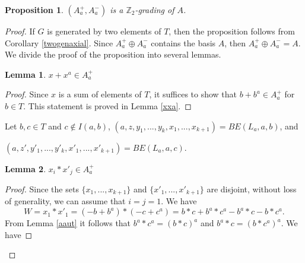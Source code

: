 \documentclass[10pt,a4paper]{amsart}
\newtheorem{lem}{Lemma}
\newtheorem{prop}{Proposition}
\newcommand\F{\mathbb{F}}
\newcommand\Z{\mathbb{Z}}
\begin{document}
\begin{prop}\label{twograd}
 $(A_a^+,A_a^-)$ is a $\Z_2$-grading of $A$. 
\end{prop}	

\begin{proof}
	If $G$ is generated by two elements of $T$, then the proposition follows from Corollary \ref{twogenaxial}. 
    Since $A_a^+\oplus A_a^-$ contains the basis $A$, then $A_a^+\oplus A_a^-=A$. We divide the proof of the proposition into several lemmas.
    
	\begin{lem}\label{xxagen}
		$x+x^a\in A^+_a$
	\end{lem}
	\begin{proof}
	Since $x$ is a sum of elements of $T$, it suffices to show that $b+b^a\in A^+_a$ for $b\in T$. This statement is proved in Lemma \ref{xxa}.
\end{proof}
	
	Let $b,c\in T$ and $c\not \in I(a,b)$, 
    $(a,z, y_1,...,y_k, x_1,...,x_{k+1})=BE(L_a, a, b)$, and
    
    $(a, z', y'_1,...,y'_k, x'_1,...,x'_{k+1})=BE(L_a, a, c)$.
		
	\begin{lem}
	$x_i*x'_j\in A^+_a$
	\end{lem}
	\begin{proof}
	

	Since the sets $\{x_1,...,x_{k+1}\}$ and $\{x'_1,...,x'_{k+1}\}$ are disjoint, without loss of generality, we can assume that $i=j=1$.
	We have
	$$W=x_1*x'_1=(-b+b^a)*(-c+c^a)=b*c+ b^a*c^a-b^a*c-b*c^a.$$
	From Lemma \ref{aaut} it follows that $b^a*c^a=(b*c)^a$ and $b^a*c=(b*c^a)^a$. We have
	
	

\end{proof}
\end{proof}
\end{document}
